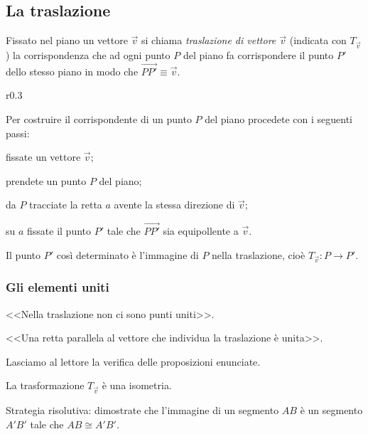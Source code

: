 \subsection{La traslazione}

\begin{definizione}
Fissato nel piano un vettore $\vec{v}$ si chiama \emph{traslazione di vettore $\vec{v}$} (indicata con $T_{\vec{v}}$) la corrispondenza che ad ogni punto $P$ del piano fa corrispondere il punto $P'$ dello stesso piano in modo che $\overset{\longrightarrow}{PP'}\equiv\vec{v}$.
\end{definizione}

\setlength{\intextsep}{3pt plus 2.0pt minus 2.0pt}
\begin{wrapfigure}{r}{0.3\textwidth}
	\centering
\end{wrapfigure}
Per costruire il corrispondente di un punto $P$ del piano procedete con i seguenti passi:
\begin{enumerate*}
\item fissate un vettore $\vec{v}$;
\item prendete un punto $P$ del piano;
\item da $P$ tracciate la retta $a$ avente la stessa direzione di $\vec{v}$;
\item su $a$ fissate il punto $P'$ tale che $\overrightarrow{PP'}$ sia equipollente a $\vec{v}$.
\end{enumerate*}
Il punto $P'$ così determinato è l'immagine di $P$ nella traslazione, cioè $T_{\vec{v}}:P\rightarrow P'$.

\subsubsection{Gli elementi uniti}

\begin{itemize*}
\item <<Nella traslazione non ci sono punti uniti>>.
\item <<Una retta parallela al vettore che individua la traslazione è unita>>.
\end{itemize*}

Lasciamo al lettore la verifica delle proposizioni enunciate.

\begin{teorema}
La trasformazione $T_{\vec{v}}$ è una isometria.
\end{teorema}

Strategia risolutiva: dimostrate che l'immagine di un segmento $AB$ è un segmento $A'B'$ tale che $AB\cong A'B'$.

